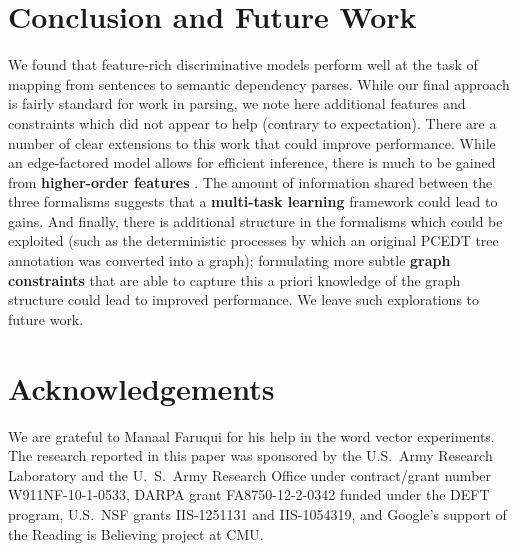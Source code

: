 \documentclass[11pt]{article}
\begin{document}
\section{Conclusion and Future Work}
We found that feature-rich discriminative models perform well at the task of
mapping from sentences to semantic dependency parses. 
While our final approach is fairly standard for work in parsing, we
note here additional features and constraints which did not
appear to help (contrary to expectation).
There are a number of clear extensions to this work that could improve
performance.
While an edge-factored model allows for efficient inference, there is
much to be gained from \textbf{higher-order features}
\citep{mcdonald_online_2006,martins_turning_2013}.
The amount of information
shared between the three formalisms suggests that a \textbf{multi-task learning}
\citep{evgeniou_regularized_2004} framework could lead to gains.
And finally, there is additional structure in the formalisms which could be
exploited (such as the deterministic processes by which an original PCEDT tree annotation was converted into a graph); formulating more subtle \textbf{graph constraints} that are able to capture this a priori
knowledge of the graph structure could lead to improved performance.  We leave such explorations to future work.



\small
\section*{Acknowledgements}
We are grateful to Manaal Faruqui for his help in the word vector experiments.
The research reported in this paper was sponsored by the U.S.~Army Research
Laboratory and the U.~S.~Army Research Office under contract/grant number
W911NF-10-1-0533, DARPA grant FA8750-12-2-0342 funded under the DEFT
program, U.S.~NSF grants IIS-1251131 and IIS-1054319, and Google's
support of the Reading is Believing project at CMU.




\end{document}
